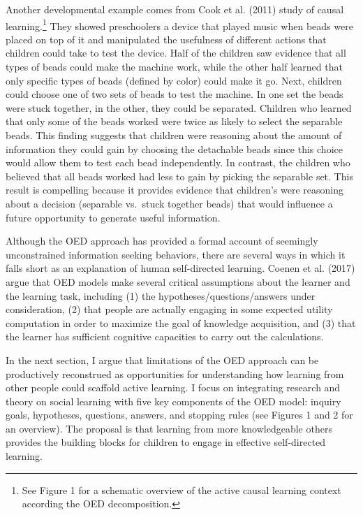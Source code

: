 \documentclass[oneside]{report}
\begin{document}
Another developmental example comes from Cook et al. (2011) study of
causal learning.\footnote{See Figure 1 for a schematic overview of the
  active causal learning context according the OED decomposition.} They
showed preschoolers a device that played music when beads were placed on
top of it and manipulated the usefulness of different actions that
children could take to test the device. Half of the children saw
evidence that all types of beads could make the machine work, while the
other half learned that only specific types of beads (defined by color)
could make it go. Next, children could choose one of two sets of beads
to test the machine. In one set the beads were stuck together, in the
other, they could be separated. Children who learned that only some of
the beads worked were twice as likely to select the separable beads.
This finding suggests that children were reasoning about the amount of
information they could gain by choosing the detachable beads since this
choice would allow them to test each bead independently. In contrast,
the children who believed that all beads worked had less to gain by
picking the separable set. This result is compelling because it provides
evidence that children's were reasoning about a decision (separable
vs.~stuck together beads) that would influence a future opportunity to
generate useful information.

Although the OED approach has provided a formal account of seemingly
unconstrained information seeking behaviors, there are several ways in
which it falls short as an explanation of human self-directed learning.
Coenen et al. (2017) argue that OED models make several critical
assumptions about the learner and the learning task, including (1) the
hypotheses/questions/answers under consideration, (2) that people are
actually engaging in some expected utility computation in order to
maximize the goal of knowledge acquisition, and (3) that the learner has
sufficient cognitive capacities to carry out the calculations.

In the next section, I argue that limitations of the OED approach can be
productively reconstrued as opportunities for understanding how learning
from other people could scaffold active learning. I focus on integrating
research and theory on social learning with five key components of the
OED model: inquiry goals, hypotheses, questions, answers, and stopping
rules (see Figures 1 and 2 for an overview). The proposal is that
learning from more knowledgeable others provides the building blocks for
children to engage in effective self-directed learning.
\end{document}
